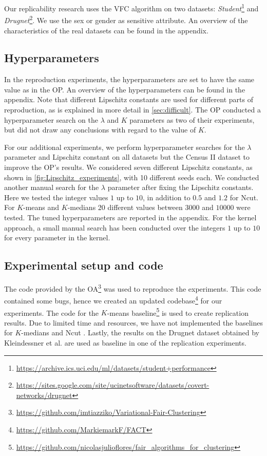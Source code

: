 Our replicability research uses the VFC algorithm on two datasets: \textit{Student}\footnote{\url{https://archive.ics.uci.edu/ml/datasets/student+performance}} and \textit{Drugnet}\footnote{\url{https://sites.google.com/site/ucinetsoftware/datasets/covert-networks/drugnet}}. We use the sex or gender as sensitive attribute. An overview of the characteristics of the real datasets can be found in the appendix.


\subsection{Hyperparameters}
In the reproduction experiments, the hyperparameters are set to have the same value as in the OP. An overview of the hyperparameters can be found in the appendix. Note that different Lipschitz constants are used for different parts of reproduction, as is explained in more detail in \autoref{sec:difficult}. The OP conducted a hyperparameter search on the $\lambda$ and $K$ parameters as two of their experiments, but did not draw any conclusions with regard to the value of $K$. 

For our additional experiments, we perform hyperparameter searches for the $\lambda$ parameter and Lipschitz constant on all datasets but the Census II dataset to improve the OP's results. We considered seven different Lipschitz constants, as shown in \autoref{fig:Lipschitz_experiments}, with 10 different seeds each. We conducted another manual search for the $\lambda$ parameter after fixing the Lipschitz constants. Here we tested the integer values $1$ up to $10$, in addition to $0.5$ and $1.2$ for Ncut. For $K$-means and $K$-medians 20 different values between $3000$ and $10000$ were tested. The tuned hyperparameters are reported in the appendix. For the kernel approach, a small manual search has been conducted over the integers $1$ up to $10$ for every parameter in the kernel.






\subsection{Experimental setup and code}
The code provided by the OA\footnote{\url{https://github.com/imtiazziko/Variational-Fair-Clustering}} was used to reproduce the experiments. This code contained some bugs, hence we created an updated codebase\footnote{\url{https://github.com/MarkiemarkF/FACT}} for our experiments. The code for the $K$-means baseline\footnote{\label{bera_note}\url{https://github.com/nicolasjulioflores/fair_algorithms_for_clustering}} \cite{bera2019fair} is used to create replication results. Due to limited time and resources, we have not implemented the baselines for $K$-medians \cite{backurs2019scalable} and Ncut \cite{kleindessner2019guarantees}. Lastly, the results on the Drugnet dataset obtained by Kleindessner et al. are used as baseline in one of the replication experiments.

